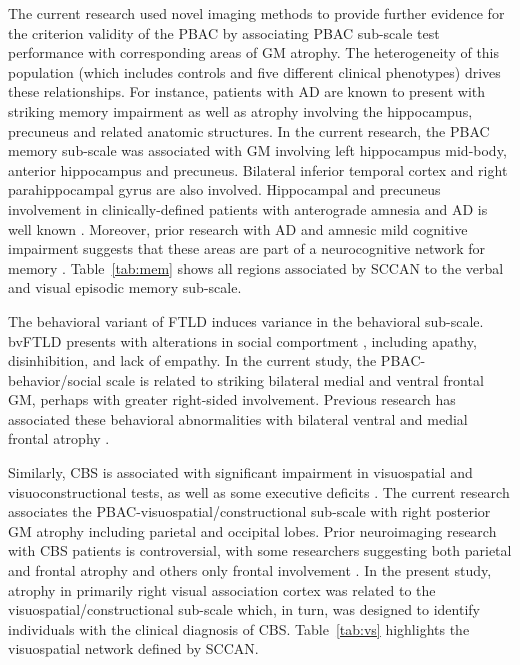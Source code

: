 \documentclass[preprint,authoryear,12pt]{elsarticle}
\begin{document}
The current research used novel imaging methods to provide further evidence for the criterion validity of the PBAC by associating PBAC sub-scale test performance with corresponding areas of GM atrophy.  The heterogeneity of this population (which includes controls and five different clinical phenotypes) drives these relationships.  For instance, patients with AD are known to present with striking memory impairment as well as atrophy involving the hippocampus, precuneus and related anatomic structures.  In the current research, the PBAC memory sub-scale was associated with GM involving left hippocampus mid-body, anterior hippocampus and precuneus.  Bilateral inferior temporal cortex and right parahippocampal gyrus are also involved.   Hippocampal and precuneus involvement in clinically-defined patients with anterograde amnesia and AD is well known \citet{Nestor2002b,Pengas2010}.  Moreover, prior research with AD and amnesic mild cognitive impairment suggests that these areas are part of a neurocognitive network for memory \citet{Delano-Wood2012,Gardini2011}.  Table~\ref{tab:mem} shows all regions associated by SCCAN to the verbal and visual episodic memory sub-scale. 

The behavioral variant of FTLD induces variance in the behavioral sub-scale.  bvFTLD presents with alterations in social comportment \citet{Rascovsky2011,Shany-Ur2011}, including apathy, disinhibition, and lack of empathy.  In the current study, the PBAC-behavior/social scale is related to striking bilateral medial and ventral frontal GM, perhaps with greater right-sided involvement.  Previous research has associated these behavioral abnormalities with bilateral ventral and medial frontal atrophy \citet{Massimo2009,Rosen2010}.  

Similarly, CBS is associated with significant impairment in visuospatial and visuoconstructional tests, as well as some executive deficits \citet{Libon2007,Libon2009}.  The current research associates the PBAC-visuospatial/constructional sub-scale with right posterior GM atrophy including parietal and occipital lobes.  Prior neuroimaging research with CBS patients is controversial, with some researchers suggesting both parietal and frontal atrophy \citet{Grossman2004b} and others only frontal involvement \citet{Hassan2011}.  In the present study, atrophy in primarily right visual association cortex was related to the visuospatial/constructional sub-scale which, in turn, was designed to identify individuals with the clinical diagnosis of CBS.  Table~\ref{tab:vs} highlights the visuospatial network defined by SCCAN.
\end{document}
